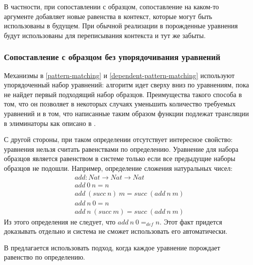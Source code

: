 В частности, при сопоставлении с образцом, сопоставление на каком-то аргументе
добавляет новые равенства в контекст, которые могут быть использованы в будущем.
При обычной реализации в \cite{dependent-pattern-matching} порожденные уравнения
будут использованы для переписывания контекста и тут же забыты.

\subsubsection{Сопоставление с образцом без упорядочивания уравнений}

Механизмы в \ref{pattern-matching} и \ref{dependent-pattern-matching} используют
упорядоченный набор уравнений: алгоритм идет сверху вниз по уравнениям, пока не
найдет первый подходящий набор образцов. Преимущества такого способа в том,
что он позволяет в некоторых случаях уменьшить количество требуемых уравнений
\cite{overlapping-and-order-independent-patterns} и в том, что написанные таким
образом функции подлежат трансляции в элиминаторы как описано в
\cite{eliminating-dependent-pattern-matching}.

С другой стороны, при таком определении отсутствует интересное свойство:
уравнения нельзя считать равенствами по определению. Уравнение для набора
образцов является равенством в системе только если все предыдущие наборы
образцов не подошли. Например, определение сложения натуральных чисел:
\begin{align*}
&add : Nat \to Nat \to Nat\\
&add\ 0\ n = n\\
&add\ (succ\ n)\ m = succ\ (add\ n\ m)\\
&add\ n\ 0 = n\\
&add\ n\ (succ\ m) = succ\ (add\ n\ m)
\end{align*}
Из этого определения не следует, что \(add\ n\ 0 =_{def} n\). Этот факт придется
доказывать отдельно и система не сможет использовать его автоматически.

В \cite{overlapping-and-order-independent-patterns} предлагается использовать
подход, когда каждое уравнение порождает равенство по определению.

